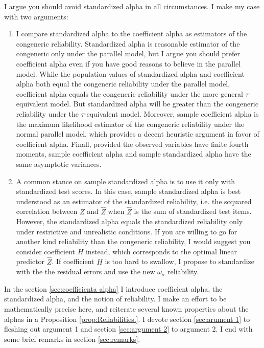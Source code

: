 \documentclass{article}
\theoremstyle{plain}
\theoremstyle{plain}
\theoremstyle{definition}
\theoremstyle{remark}
\theoremstyle{definition}
\theoremstyle{plain}
\theoremstyle{plain}
\theoremstyle{definition}
\begin{document}
I argue you should avoid standardized alpha in all circumstances. I make my case with two arguments:

\begin{enumerate}[label=\arabic*.]
\item I compare standardized alpha to the coefficient alpha as estimators of the congeneric reliability. Standardized alpha is reasonable estimator of the congeneric only under the parallel model, but I argue you should prefer coefficient alpha even if you have good reasons to believe in the parallel model. While the population values of standardized alpha and coefficient alpha both equal the congeneric reliability under the parallel model, coefficient alpha equals the congeneric reliability under the more general $\tau$-equivalent model. But standardized alpha will be greater than the congeneric reliability under the $\tau$-equivalent model. Moreover, sample coefficient alpha is the maximum likelihood estimator of the congeneric reliability under the normal parallel model, which provides a decent heuristic argument in favor of coefficient alpha. Finall, provided the observed variables have finite fourth moments, sample coefficient alpha and sample standardized alpha have the same asymptotic variances. 

\item A common stance on sample standardized alpha is to use it only with standardized test scores. In this case, sample standardized alpha is best understood as an estimator of the standardized reliability, i.e. the scquared correlation between $Z$ and $\widehat{Z}$ when $\widehat{Z}$ is the sum of standardized test items. However, the standardized alpha equals the standardized reliability only under restrictive and unrealistic conditions. If you are willing to go for another kind reliability than the congeneric reliability, I would suggest you consider coefficient $H$ instead, which corresponds to the optimal linear predictor $\widehat{Z}$. If coefficient $H$ is too hard to swallow, I propose to standardize with the the residual errors and use the new $\omega_\sigma$ reliability.
\end{enumerate}

In the section \ref{sec:coefficienta alpha} I introduce coefficient alpha, the standardized alpha, and the notion of reliability. I make an effort to be mathematically precise here, and reiterate several known properties about the alphas in a Proposition \ref{prop:Reliabilities.}. I devote section \ref{sec:arument 1} to fleshing out argument 1 and section \ref{sec:argument 2} to argument 2. I end with some brief remarks in section \ref{sec:remarks}.
\end{document}
